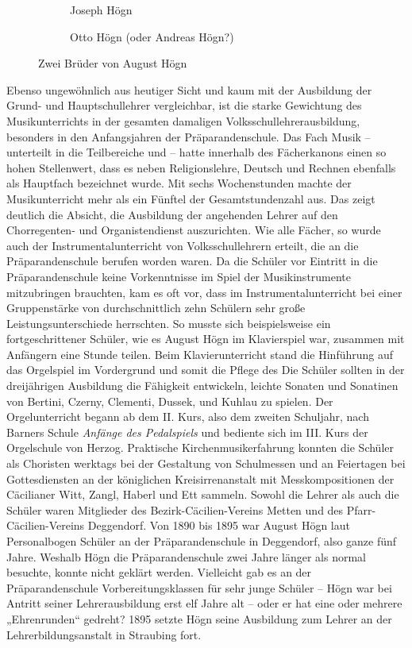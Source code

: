 \begin{figure}
\begin{subfigure}[b]{0.5\linewidth}
\centering
{}
\caption{Joseph Högn}
\end{subfigure}
\begin{subfigure}[b]{0.5\linewidth}
\centering
{}
\caption{Otto Högn (oder Andreas Högn?)}
\end{subfigure}
\caption{Zwei Brüder von August Högn}
\end{figure}

Ebenso ungewöhnlich aus heutiger Sicht und kaum mit der Ausbildung der
Grund- und Hauptschullehrer vergleichbar, ist die starke Gewichtung des
Musikunterrichts in der gesamten damaligen Volksschullehrerausbildung,
besonders in den Anfangsjahren der Präparandenschule. Das Fach Musik –
unterteilt in die Teilbereiche  und  – hatte innerhalb
des Fächerkanons einen so hohen Stellenwert, dass es neben
Religionslehre, Deutsch und Rechnen ebenfalls als Hauptfach bezeichnet
wurde. Mit sechs Wochenstunden machte der Musikunterricht mehr als ein
Fünftel der Gesamtstundenzahl aus. Das zeigt deutlich die Absicht, die
Ausbildung der angehenden Lehrer auf den Chorregenten- und
Organistendienst auszurichten. Wie alle Fächer, so wurde auch der
Instrumentalunterricht von Volksschullehrern erteilt, die an die
Präparandenschule berufen worden waren. Da die Schüler vor Eintritt in
die Präparandenschule keine Vorkenntnisse im Spiel der Musikinstrumente
mitzubringen brauchten, kam es oft vor, dass im Instrumentalunterricht
bei einer Gruppenstärke von durchschnittlich zehn Schülern sehr große
Leistungsunterschiede herrschten. So musste sich beispielsweise ein
fortgeschrittener Schüler, wie es August Högn im Klavierspiel war,
zusammen mit Anfängern eine Stunde teilen. Beim Klavierunterricht stand
die Hinführung auf das Orgelspiel im Vordergrund und somit die Pflege
des  Die Schüler sollten in der
dreijährigen Ausbildung die Fähigkeit entwickeln, leichte Sonaten und
Sonatinen von Bertini, Czerny, Clementi, Dussek, und Kuhlau zu spielen.
Der Orgelunterricht begann ab dem II. Kurs, also dem zweiten Schuljahr,
nach Barners Schule \textit{Anfänge des Pedalspiels} und bediente sich
im III. Kurs der Orgelschule von Herzog. Praktische
Kirchenmusikerfahrung konnten die Schüler als Choristen werktags bei
der Gestaltung von Schulmessen und an Feiertagen bei Gottesdiensten an
der königlichen Kreisirrenanstalt mit Messkompositionen der Cäcilianer
Witt, Zangl, Haberl und Ett sammeln. Sowohl die Lehrer als auch die
Schüler waren Mitglieder des Bezirk-Cäcilien-Vereins Metten und des
Pfarr-Cäcilien-Vereins Deggendorf. Von 1890 bis 1895 war August Högn
laut Personalbogen Schüler an der Präparandenschule in Deggendorf, also
ganze fünf Jahre. Weshalb Högn die Präparandenschule zwei Jahre länger
als normal besuchte, konnte nicht geklärt werden. Vielleicht gab es an
der Präparandenschule Vorbereitungsklassen für sehr junge Schüler –
Högn war bei Antritt seiner Lehrerausbildung erst elf Jahre alt – oder
er hat eine oder mehrere „Ehrenrunden“ gedreht? 1895 setzte Högn seine
Ausbildung zum Lehrer an der Lehrerbildungsanstalt in Straubing fort.


